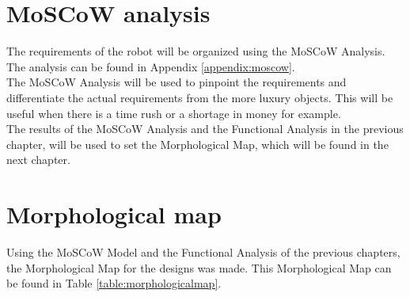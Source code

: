 \documentclass[11pt,twoside,a4paper]{report}
\begin{document}
\chapter{MoSCoW analysis}
The requirements of the robot will be organized using the MoSCoW Analysis. The analysis can be found in Appendix \ref{appendix:moscow}. \\
The MoSCoW Analysis will be used to pinpoint the requirements and differentiate the actual requirements from the more luxury objects. This will be useful when there is a time rush or a shortage in money for example. \\
The results of the MoSCoW Analysis and the Functional Analysis in the previous chapter, will be used to set the Morphological Map, which will be found in the next chapter.

\chapter{Morphological map}
Using the MoSCoW Model and the Functional Analysis of the previous chapters, the Morphological Map for the designs was made. This Morphological Map can be found in Table \ref{table:morphologicalmap}.
\end{document}
